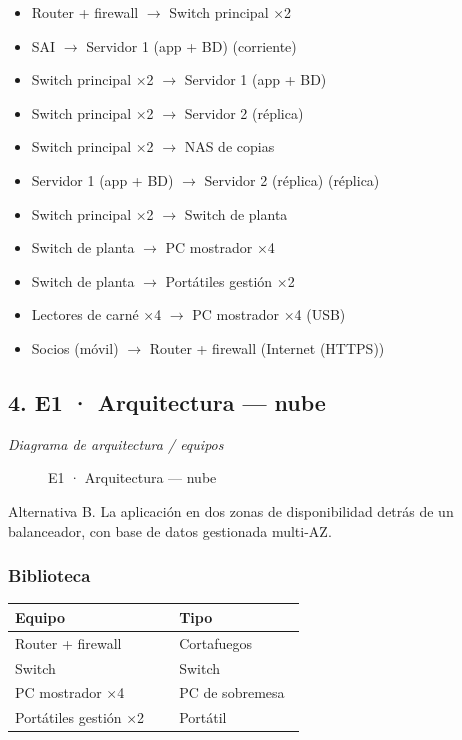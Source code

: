 \begin{itemize}
\item Router + firewall $\rightarrow$ Switch principal ×2
\item SAI $\rightarrow$ Servidor 1 (app + BD) (corriente)
\item Switch principal ×2 $\rightarrow$ Servidor 1 (app + BD)
\item Switch principal ×2 $\rightarrow$ Servidor 2 (réplica)
\item Switch principal ×2 $\rightarrow$ NAS de copias
\item Servidor 1 (app + BD) $\rightarrow$ Servidor 2 (réplica) (réplica)
\item Switch principal ×2 $\rightarrow$ Switch de planta
\item Switch de planta $\rightarrow$ PC mostrador ×4
\item Switch de planta $\rightarrow$ Portátiles gestión ×2
\item Lectores de carné ×4 $\rightarrow$ PC mostrador ×4 (USB)
\item Socios (móvil) $\rightarrow$ Router + firewall (Internet (HTTPS))
\end{itemize}

\subsection*{4. E1 · Arquitectura — nube}

\emph{Diagrama de arquitectura / equipos}

\begin{figure}[H]
\centering
{}
\caption{E1 · Arquitectura — nube}
\end{figure}

Alternativa B. La aplicación en dos zonas de disponibilidad detrás de un balanceador, con base de datos gestionada multi-AZ.

\subsubsection*{Biblioteca}

{\small
\begin{longtable}{@{}>{\raggedright\arraybackslash}p{0.534\linewidth}>{\raggedright\arraybackslash}p{0.415\linewidth}@{}}
\toprule
\textbf{Equipo} & \textbf{Tipo} \\
\midrule
\endhead
Router + firewall & Cortafuegos \\
Switch & Switch \\
PC mostrador ×4 & PC de sobremesa \\
Portátiles gestión ×2 & Portátil \\
\bottomrule
\end{longtable}}

